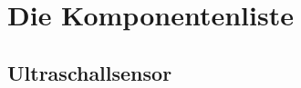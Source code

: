 \renewcommand{\autoren}{Valentyn Chepil}
\newpage
\section{Die Komponentenliste}
\subsection{Ultraschallsensor}